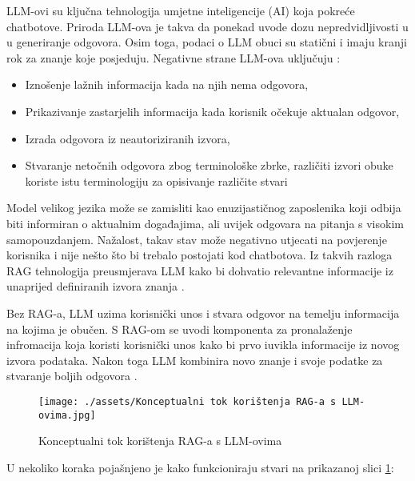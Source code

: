\documentclass[]{foi}
\begin{document}
LLM-ovi su ključna tehnologija umjetne inteligencije (AI) koja pokreće chatbotove. Priroda LLM-ova je takva da ponekad uvode dozu nepredvidljivosti u
u generiranje odgovora. Osim toga, podaci o LLM obuci su statični i imaju kranji rok za znanje koje posjeduju. Negativne strane LLM-ova uključuju \cite{awsRAG2025}:

\begin{itemize}
    \item {Iznošenje lažnih informacija kada na njih nema odgovora,} 
    \item {Prikazivanje zastarjelih informacija kada korisnik očekuje aktualan odgovor,} 
    \item {Izrada odgovora iz neautoriziranih izvora,} 
    \item {Stvaranje netočnih odgovora zbog terminološke zbrke, različiti izvori obuke koriste istu terminologiju za opisivanje različite stvari}
\end{itemize}

Model velikog jezika može se zamisliti kao enuzijastičnog zaposlenika koji odbija biti informiran o aktualnim događajima, ali uvijek odgovara
na pitanja s visokim samopouzdanjem. Nažalost, takav stav može negativno utjecati na povjerenje korisnika i nije nešto što bi trebalo postojati
kod chatbotova. Iz takvih razloga RAG tehnologija preusmjerava LLM kako bi dohvatio relevantne informacije iz unaprijed definiranih izvora znanja \cite{awsRAG2025}.
\newpage

Bez RAG-a, LLM uzima korisnički unos i stvara odgovor na temelju informacija na kojima je obučen. S RAG-om se uvodi komponenta za pronalaženje 
infromacija koja koristi korisnički unos kako bi prvo iuvikla informacije iz novog izvora podataka. Nakon toga LLM kombinira novo znanje i svoje 
podatke za stvaranje boljih odgovora \cite{awsRAG2025}.

\begin{figure}[h!]
    \centering
    \texttt{[image: ./assets/Konceptualni tok korištenja RAG-a s LLM-ovima.jpg]} 
    \caption{Konceptualni tok korištenja RAG-a s LLM-ovima}
    \label{fig:slika1}
\end{figure}

U nekoliko koraka pojašnjeno je kako funkcioniraju stvari na prikazanoj slici \ref{fig:slika1}\cite{awsRAG2025}:
\end{document}
